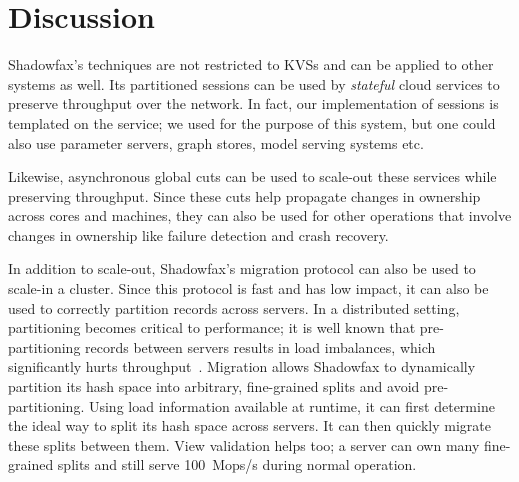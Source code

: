 \section{Discussion}
\label{sec:discussion}

Shadowfax's techniques are not restricted to KVSs and can be applied to
other systems as well.
%
Its partitioned sessions can be used by \emph{stateful} cloud services
to preserve throughput over the network.
%
In fact, our implementation of sessions is templated on the service; we
used \faster for the purpose of this system, but one could also use
parameter servers, graph stores, model serving systems etc.

Likewise, asynchronous global cuts can be used to scale-out these
services while preserving throughput.
%
Since these cuts help propagate changes in ownership
across cores and machines, they can also be used for other operations
that involve changes in ownership like
failure detection and crash recovery.

In addition to scale-out, Shadowfax's migration protocol can also be
used to scale-in a cluster.
%
Since this protocol is fast and has low impact, it can also be used to
correctly partition records across servers.
%
In a distributed setting, partitioning becomes critical to
performance; it is well known that pre-partitioning records between
servers results in load imbalances, which significantly hurts
throughput~\cite{dynamo,slicer}.
%
Migration allows Shadowfax to
dynamically partition its hash space into arbitrary, fine-grained splits
and
avoid pre-partitioning.
%
Using load information available at runtime, it can first determine the ideal
way to split its hash space across servers.
%
It can then quickly migrate these splits
between them.
%
View validation helps too; a server can own many fine-grained splits and still
serve 100~Mops/s during normal operation.
